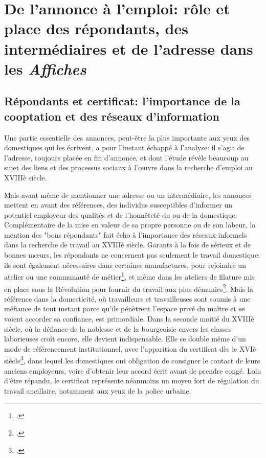 \part{De l'annonce à l'emploi:  rôle et place des répondants, des intermédiaires et de l'adresse dans les \textit{Affiches}}


\chapter{Répondants et certificat: l'importance de la cooptation et des réseaux d’information}

Une partie essentielle des annonces, peut-être la plus importante aux yeux des domestiques qui les écrivent, a pour l'instant échappé à l'analyse: il s'agit de l'adresse, toujours placée en fin d'annonce, et dont l'étude révèle beaucoup au sujet des liens et des processus sociaux à l'œuvre dans la recherche d'emploi au XVIIIè siècle. 

Mais avant même de mentionner une adresse ou un intermédiaire, les annonces mettent en avant des références, des individus susceptibles d'informer un potentiel employeur des qualités et de l'honnêteté du ou de la domestique. Complémentaire de la mise en valeur de sa propre personne ou de son labeur, la mention des "bons répondants" fait écho à l’importance des réseaux informels dans la recherche de travail au XVIIIè siècle. Garants à la fois de sérieux et de bonnes mœurs, les répondants ne concernent pas seulement le travail domestique: ils sont également nécessaires dans certaines manufactures, pour rejoindre un atelier ou une communauté de métier\footcites[p.86-87]{crowstonFabricatingWomenSeamstresses2001}, et même dans les ateliers de filature mis en place sous la Révolution pour fournir du travail aux plus démunies\footcites[p.43]{dicaprioOriginsWelfareState2007}. Mais la référence dans la domesticité, où travailleurs et travailleuses sont soumis à une méfiance de tout instant parce qu'ils pénètrent l'espace privé du maître et se voient accorder sa confiance, est primordiale. Dans la seconde moitié du XVIIIè siècle, où la défiance de la noblesse et de la bourgeoisie envers les classes laborieuses croît encore, elle devient indispensable. Elle se double même d'un mode de référencement institutionnel, avec l'apparition du certificat dès le XVIè siècle\footcites{guttonDomestiquesServiteursDans1981}, dans lequel les domestiques ont obligation de consigner le contact de leurs anciens employeurs, voire d'obtenir leur accord écrit avant de prendre congé. Loin d'être répandu, le certificat représente néanmoins un moyen fort de régulation du travail ancillaire, notamment aux yeux de la police urbaine. 

